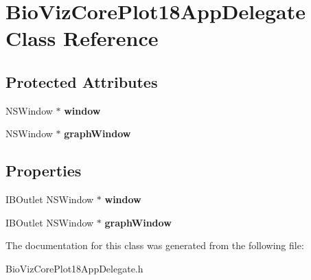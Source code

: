 \hypertarget{interface_bio_viz_core_plot18_app_delegate}{
\section{BioVizCorePlot18AppDelegate Class Reference}
\label{interface_bio_viz_core_plot18_app_delegate}
}
\subsection*{Protected Attributes}
\begin{DoxyCompactItemize}
\item 
\hypertarget{interface_bio_viz_core_plot18_app_delegate_a2d2e095c1c34a31d9a23b0a5ee9ce18c}{
NSWindow $\ast$ {\bfseries window}}
\label{interface_bio_viz_core_plot18_app_delegate_a2d2e095c1c34a31d9a23b0a5ee9ce18c}

\item 
\hypertarget{interface_bio_viz_core_plot18_app_delegate_af0094ecb11afa2f04a0a87632bf8057c}{
NSWindow $\ast$ {\bfseries graphWindow}}
\label{interface_bio_viz_core_plot18_app_delegate_af0094ecb11afa2f04a0a87632bf8057c}

\end{DoxyCompactItemize}
\subsection*{Properties}
\begin{DoxyCompactItemize}
\item 
\hypertarget{interface_bio_viz_core_plot18_app_delegate_a4b6147a4fdea7fb75bd36aa69ab140d7}{
IBOutlet NSWindow $\ast$ {\bfseries window}}
\label{interface_bio_viz_core_plot18_app_delegate_a4b6147a4fdea7fb75bd36aa69ab140d7}

\item 
\hypertarget{interface_bio_viz_core_plot18_app_delegate_a7b43e9cbdfa43c1ef924ab848a104201}{
IBOutlet NSWindow $\ast$ {\bfseries graphWindow}}
\label{interface_bio_viz_core_plot18_app_delegate_a7b43e9cbdfa43c1ef924ab848a104201}

\end{DoxyCompactItemize}


The documentation for this class was generated from the following file:\begin{DoxyCompactItemize}
\item 
BioVizCorePlot18AppDelegate.h\end{DoxyCompactItemize}
